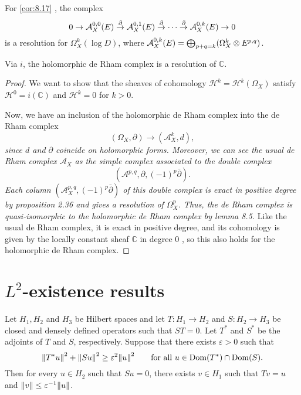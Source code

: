 \documentclass[lang=en,12pt]{beautybook}
\begin{document}
For \autoref{cor:8.17} , the complex 
\[
  0\rightarrow {\mathcal A}_X^{0,0}(E)\stackrel{\bar{\partial}}{\rightarrow}{\mathcal A}_X^{0,1}(E)\stackrel{\bar{\partial}}{\rightarrow}\cdots\stackrel{\bar{\partial}}{\rightarrow}{\mathcal A}_X^{0,k}(E)\rightarrow 0
\]
is a resolution for $\Omega_X^k (\log D)$, where ${\mathcal A}_X^{0,k}(E)=\bigoplus_{p+q=k}(\Omega_X^{k}\otimes E^{p,q}) $.

\begin{lemma}
Via $i$, the holomorphic de Rham complex is a resolution of $\mathbb{C}$. 

\end{lemma}
  \begin{proof}
    We want to show that the sheaves of cohomology $\mathcal{H}^k=\mathcal{H}^k\left(\Omega_X\right)$ satisfy $\mathcal{H}^0=i(\mathbb{C})$ and $\mathcal{H}^k=0$ for $k>0$.

Now, we have an inclusion of the holomorphic de Rham complex into the de Rham complex
\begin{equation*}
\left(\Omega_X, \partial\right) \rightarrow\left(\mathcal{A}_X^k, d\right),
\end{equation*}
\textit{since $d$ and $\partial$ coincide on holomorphic forms. Moreover, we can see the usual de Rham complex $\mathcal{A}_X$ as the simple complex associated to the double complex}
\begin{equation*}
\left(\mathcal{A}^{p, q}, \partial,(-1)^p \bar{\partial}\right) .
\end{equation*}
\textit{Each column $\left(\mathcal{A}_X^{p, q},(-1)^p \bar{\partial}\right)$ of this double complex is exact in positive degree by proposition 2.36 and gives a resolution of $\Omega_X^p$. Thus, the de Rham complex is quasi-isomorphic to the holomorphic de Rham complex by lemma 8.5. }Like the usual de Rham complex, it is exact in positive degree, and its cohomology is given by the locally constant sheaf $\mathbb{C}$ in degree 0 , so this also holds for the holomorphic de Rham complex.
  \end{proof}
\section{\texorpdfstring{$L^2$}{}-existence results}
\clearpage
\begin{lemma}
  Let $H_{1}, H_{2}$ and $H_{3}$ be Hilbert spaces and let $T \colon H_{1} \to H_{2}$ and $S \colon H_{2} \to H_{3}$ be closed and densely defined operators such that $ST = 0$. Let $T^*$ and $S^*$ be the adjoints of $T$ and $S$, respectively. Suppose that there exists $\varepsilon > 0$ such that
  \newcommand{\Dom}{\operatorname{Dom}}
  $$ \norm{T^* u}^{2} + \norm{S u}^{2} \geq \varepsilon^{2} \norm{u}^{2} \qquad \textnormal{for all } u \in \Dom(T^*) \cap \Dom(S).$$
  Then for every $u \in H_{2}$ such that $Su =0$, there exists $v \in H_{1}$ such that $Tv = u$ and $\norm{v} \leq \varepsilon^{-1} \norm{u}$.
\end{lemma}
\end{document}
